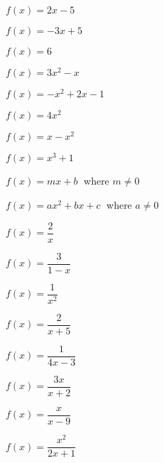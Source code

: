 \begin{exenum}

\item $f(x) = 2x - 5$ \label{diffquotexerfirsta}
\item $f(x) = -3x + 5$

\item $f(x) = 6$
\item $f(x) = 3x^2 - x$

\item $f(x) = -x^2 + 2x - 1$
\item  $f(x) = 4x^2$ 

\item  $f(x) = x-x^2$ 
\item $f(x) = x^{3} + 1$

\item $f(x) = mx + b\;$ where $m \neq 0$
\item $f(x) = ax^{2} + bx + c\;$ where $a \neq 0$  \label{diffquotexerlasta}


\item $f(x) = \dfrac{2}{x}$  \label{diffquotexerfirstb}
\item $f(x) = \dfrac{3}{1-x}$

\item  $f(x) = \dfrac{1}{x^2}$
\item  $f(x) = \dfrac{2}{x+5}$

\item $f(x) = \dfrac{1}{4x-3}$ 
\item $f(x) = \dfrac{3x}{x+2}$ 

\item $f(x) = \dfrac{x}{x - 9}$
\item $f(x) = \dfrac{x^2}{2x+1}$  \label{diffquotexerlastb}


\end{exenum}
